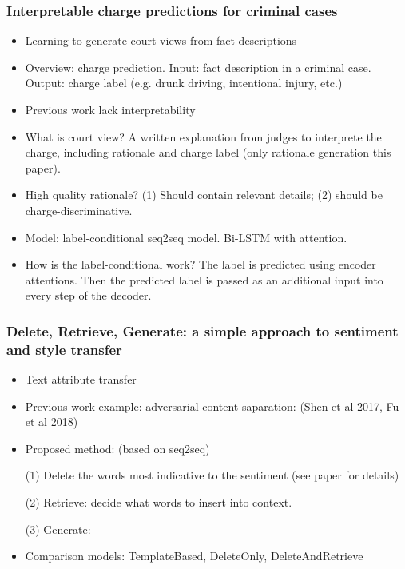 \subsubsection{Interpretable charge predictions for criminal cases}
\begin{itemize}
	\item Learning to generate court views from fact descriptions \cite{Ye2018Interpretable}
	\item Overview: charge prediction. Input: fact description in a criminal case. Output: charge label (e.g. drunk driving, intentional injury, etc.)
	\item Previous work lack interpretability
	\item What is court view? A written explanation from judges to interprete the charge, including rationale and charge label (only rationale generation this paper).
	\item High quality rationale? (1) Should contain relevant details; (2) should be charge-discriminative.
	\item Model: label-conditional seq2seq model. Bi-LSTM with attention. 
	\item How is the label-conditional work? The label is predicted using encoder attentions. Then the predicted label is passed as an additional input into every step of the decoder.
\end{itemize}


\subsubsection{Delete, Retrieve, Generate: a simple approach to sentiment and style transfer \cite{Li2018Delete}}
\begin{itemize}
	\item Text attribute transfer
	\item Previous work example: adversarial content saparation: (Shen et al 2017, Fu et al 2018)
	\item Proposed method: (based on seq2seq)
	
	(1) Delete the words most indicative to the sentiment (see paper for details)
	
	(2) Retrieve: decide what words to insert into context.
	
	(3) Generate: 
	
	\item Comparison models: TemplateBased, DeleteOnly, DeleteAndRetrieve

\end{itemize}


